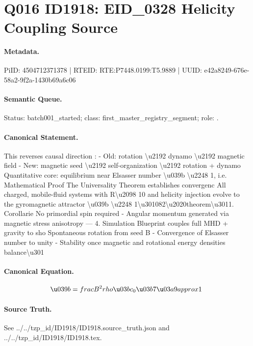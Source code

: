 \section*{Q016 ID1918: EID\_0328 Helicity Coupling Source}
\paragraph{Metadata.}
PiID: 4504712371378 | RTEID: RTE:P7448.0199:T5.9889 | UUID: e42a8249-676e-58a2-9f2a-1430b69a6c06

\paragraph{Semantic Queue.}
Status: batch001\_started; class: first\_master\_registry\_segment; role: .

\paragraph{Canonical Statement.}
This reverses causal direction : - Old: rotation \textbackslash{}u2192 dynamo \textbackslash{}u2192 magnetic field - New: magnetic seed \textbackslash{}u2192 self-organization \textbackslash{}u2192 rotation + dynamo Quantitative core: equilibrium near Elsasser number \textbackslash{}u039b \textbackslash{}u2248 1, i.e. Mathematical Proof The Universality Theorem establishes convergenc All charged, mobile-fluid systems with R\textbackslash{}u2098 10 and helicity injection evolve to the gyromagnetic attractor \textbackslash{}u039b \textbackslash{}u2248 1\textbackslash{}u301082\textbackslash{}u2020theorem\textbackslash{}u3011. Corollarie No primordial spin required - Angular momentum generated via magnetic stress anisotropy --- 4. Simulation Blueprint couples full MHD + gravity to sho Spontaneous rotation from seed B - Convergence of Elsasser number to unity - Stability once magnetic and rotational energy densities balance\textbackslash{}u301

\paragraph{Canonical Equation.}
\[
\u039b = \\frac{B^2}{\\rho \u03bc_0 \u03b7 \u03a9} \\approx 1 \
\]

\paragraph{Source Truth.}
See ../../tzp\_id/ID1918/ID1918.source\_truth.json and ../../tzp\_id/ID1918/ID1918.tex.
